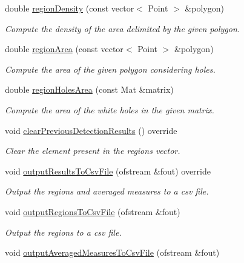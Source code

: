 \begin{DoxyCompactItemize}
double \hyperlink{classmultiscale_1_1analysis_1_1RegionDetector_a6beb6b2ecaccd60130bcf8dd808750b8}{region\-Density} (const vector$<$ Point $>$ \&polygon)
\begin{DoxyCompactList}\small\item\em Compute the density of the area delimited by the given polygon. \end{DoxyCompactList}\item 
double \hyperlink{classmultiscale_1_1analysis_1_1RegionDetector_a938fa8d165c87dc69e962883942072d2}{region\-Area} (const vector$<$ Point $>$ \&polygon)
\begin{DoxyCompactList}\small\item\em Compute the area of the given polygon considering holes. \end{DoxyCompactList}\item 
double \hyperlink{classmultiscale_1_1analysis_1_1RegionDetector_ab110a0a67852484c700ff035089fce18}{region\-Holes\-Area} (const Mat \&matrix)
\begin{DoxyCompactList}\small\item\em Compute the area of the white holes in the given matrix. \end{DoxyCompactList}\item 
void \hyperlink{classmultiscale_1_1analysis_1_1RegionDetector_a4a89f3a28cbb473acc32f22b49d09389}{clear\-Previous\-Detection\-Results} () override
\begin{DoxyCompactList}\small\item\em Clear the element present in the regions vector. \end{DoxyCompactList}\item 
void \hyperlink{classmultiscale_1_1analysis_1_1RegionDetector_a9da92f7959fe324f24301c5bf780fbbd}{output\-Results\-To\-Csv\-File} (ofstream \&fout) override
\begin{DoxyCompactList}\small\item\em Output the regions and averaged measures to a csv file. \end{DoxyCompactList}\item 
void \hyperlink{classmultiscale_1_1analysis_1_1RegionDetector_a9289ea9b1ceb3bd21317170d72a889e4}{output\-Regions\-To\-Csv\-File} (ofstream \&fout)
\begin{DoxyCompactList}\small\item\em Output the regions to a csv file. \end{DoxyCompactList}\item 
void \hyperlink{classmultiscale_1_1analysis_1_1RegionDetector_ac060acf205b878f79b67093f178f265f}{output\-Averaged\-Measures\-To\-Csv\-File} (ofstream \&fout)

\end{DoxyCompactItemize}
